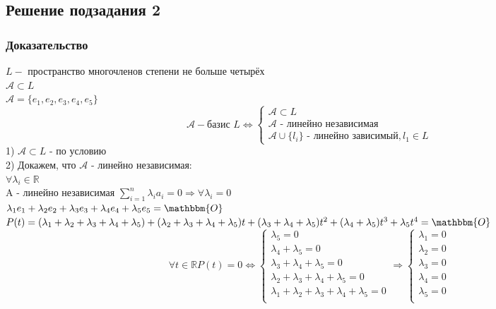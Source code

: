 \documentclass{article}
\begin{document}
    \subsection{Решение подзадания 2}
    \subsubsection{Доказательство}
    $L - $ пространство многочленов степени не больше четырёх \\
    $\mathcal{A} \subset L$ \\
    $\mathcal{A} = \{e_1, e_2, e_3, e_4, e_5\}$
    \[
    \mathcal{A} - \text{базис } L \iff 
    \begin{cases}
        \mathcal{A} \subset L \\
        \mathcal{A} \text{ - линейно независимая} \\
        \mathcal{A} \cup \{l_i\} \text{ - линейно зависимый}, l_1 \in L
    \end{cases}
    \]
    1) $\mathcal{A} \subset L$ - по условию \\
    2) Докажем, что $\mathcal{A} \text{ - линейно независимая}$: \\
    $\forall \lambda_i \in \mathbb{R}$ \\
    A - линейно независимая \iff $\sum\limits_{i=1}^n \lambda_i a_i = 0 \Rightarrow \forall \lambda_i = 0$ \\
    $\lambda_1 e_1 + \lambda_2 e_2 + \lambda_3 e_3 + \lambda_4 e_4 + \lambda_5 e_5 = \mathbbm{O}$ \\
    $P(t) = (\lambda_1 + \lambda_2 + \lambda_3 + \lambda_4 + \lambda_5) + (\lambda_2 + \lambda_3 + \lambda_4 + \lambda_5)t + (\lambda_3 + \lambda_4 + \lambda_5)t^2 + (\lambda_4 + \lambda_5)t^3 + \lambda_5 t^4 = \mathbbm{O}$ 
    \[
    \forall t \in \mathbb{R} P(t) = 0 \iff 
    \begin{cases}
        \lambda_5 = 0 \\
        \lambda_4 + \lambda_5 = 0 \\
        \lambda_3 + \lambda_4 + \lambda_5 = 0 \\
        \lambda_2 + \lambda_3 + \lambda_4 + \lambda_5 = 0 \\
        \lambda_1 + \lambda_2 + \lambda_3 + \lambda_4 + \lambda_5 = 0 \\
    \end{cases}
    \Rightarrow
    \begin{cases}
        \lambda_1 = 0 \\
        \lambda_2 = 0 \\
        \lambda_3 = 0 \\
        \lambda_4 = 0 \\
        \lambda_5 = 0 \\
    \end{cases}
    \]
\end{document}

